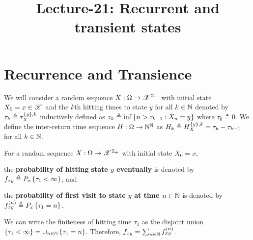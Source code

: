\documentclass[letterpaper,10pt,english]{article}
\title{ Lecture-21: Recurrent and transient states}
\author{}
\begin{document}
\maketitle


\section{Recurrence and Transience}
We will consider a random sequence $X:\Omega\to\mathscr{X}^{\mathbb{Z}_+}$ with initial state $X_0 = x\in\mathscr{X}$ and the $k$th hitting times to state $y$ for all $k \in \mathbb{N}$ denoted by $\tau_k \triangleq \tau_X^{\left\{y\right\},k}$ inductively defined as $\tau_k \triangleq \inf\left\{n > \tau_{k-1}: X_n = y\right\}$ where $\tau_0 \triangleq 0$. 
We define the inter-return time sequence $H:\Omega\to\mathbb{N}^{\mathbb{N}}$ as $H_k \triangleq H_X^{\left\{y\right\},k} = \tau_k - \tau_{k-1}$ for all $k \in \mathbb{N}$. 
\begin{defn} 
For a random sequence $X: \Omega \to \mathscr{X}^{\mathbb{Z}_+}$ with initial state $X_0 = x$, 
\begin{compactenum}[(i)]
\item the \textbf{probability of hitting state $y$ eventually} is denoted by 
$f_{xy} \triangleq P_x\left\{\tau_1 < \infty\right\}$, 
and 
\item the \textbf{probability of first visit to state $y$ at time $n \in\mathbb{N}$} is denoted by 
$f_{xy}^{(n)} 
\triangleq P_x\set{\tau_1 = n}. %
$
\end{compactenum}
\end{defn}
\begin{rem}
We can write the finiteness of hitting time $\tau_1$ as the disjoint union $\left\{\tau_1 < \infty\right\} = \cup_{n \in \mathbb{N}}\left\{\tau_1=n\right\}$. 
Therefore, $f_{xy} = \sum_{n\in\mathbb{N}}f_{xy}^{(n)}$. 
\end{rem}
\end{document}
